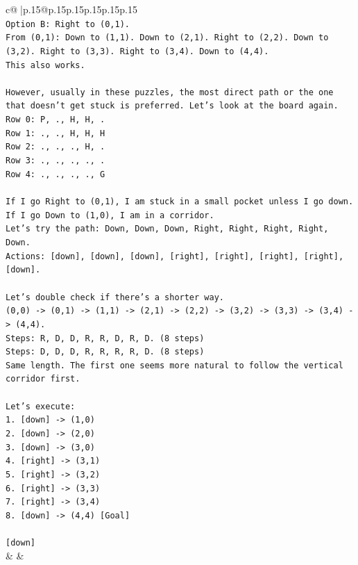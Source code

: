 \documentclass{article}
\begin{document}
{\begin{supertabular}{c@{$\;$}|p{.15\linewidth}@{}p{.15\linewidth}p{.15\linewidth}p{.15\linewidth}p{.15\linewidth}p{.15\linewidth}}
{{{\\ 
\texttt{Option B: Right to (0,1).} \\
\texttt{From (0,1): Down to (1,1). Down to (2,1). Right to (2,2). Down to (3,2). Right to (3,3). Right to (3,4). Down to (4,4).} \\
\texttt{This also works.} \\
\\ 
\texttt{However, usually in these puzzles, the most direct path or the one that doesn't get stuck is preferred. Let's look at the board again.} \\
\texttt{Row 0: P, ., H, H, .} \\
\texttt{Row 1: ., ., H, H, H} \\
\texttt{Row 2: ., ., ., H, .} \\
\texttt{Row 3: ., ., ., ., .} \\
\texttt{Row 4: ., ., ., ., G} \\
\\ 
\texttt{If I go Right to (0,1), I am stuck in a small pocket unless I go down.} \\
\texttt{If I go Down to (1,0), I am in a corridor.} \\
\texttt{Let's try the path: Down, Down, Down, Right, Right, Right, Right, Down.} \\
\texttt{Actions: {[}down{]}, {[}down{]}, {[}down{]}, {[}right{]}, {[}right{]}, {[}right{]}, {[}right{]}, {[}down{]}.} \\
\\ 
\texttt{Let's double check if there's a shorter way.} \\
\texttt{(0,0) {-}> (0,1) {-}> (1,1) {-}> (2,1) {-}> (2,2) {-}> (3,2) {-}> (3,3) {-}> (3,4) {-}> (4,4).} \\
\texttt{Steps: R, D, D, R, R, D, R, D. (8 steps)} \\
\texttt{Steps: D, D, D, R, R, R, R, D. (8 steps)} \\
\texttt{Same length. The first one seems more natural to follow the vertical corridor first.} \\
\\ 
\texttt{Let's execute:} \\
\texttt{1. {[}down{]} {-}> (1,0)} \\
\texttt{2. {[}down{]} {-}> (2,0)} \\
\texttt{3. {[}down{]} {-}> (3,0)} \\
\texttt{4. {[}right{]} {-}> (3,1)} \\
\texttt{5. {[}right{]} {-}> (3,2)} \\
\texttt{6. {[}right{]} {-}> (3,3)} \\
\texttt{7. {[}right{]} {-}> (3,4)} \\
\texttt{8. {[}down{]} {-}> (4,4) {[}Goal{]}} \\
\\ 
\texttt{{[}down{]}} \\
            }
        }
    }
    & & \\ \\


\end{supertabular}}
\end{document}
